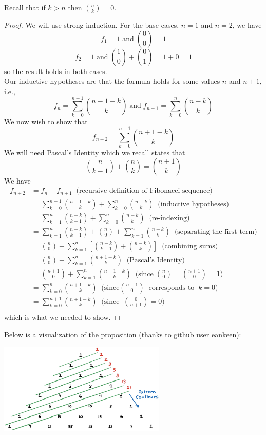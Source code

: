 \documentclass[handout]{ximera}
\begin{document}
\begin{remark}
Recall that if $k>n$ then $\binom{n}{k} = 0$.
\end{remark}

\begin{proof}
We will use strong induction. For the base cases, $n=1$ and $n=2$, we have
\[
f_1 =1  \; \text{and} \; \binom{0}{0} = 1 
\]
\[
f_2 =  1 \; \text{and} \; 
\binom{1}{0} + \binom{0}{1} = 1 + 0 = 1
\]
so the result holds in both cases.\\
Our inductive hypotheses are that the formula holds for some values $n$ and $n+1$, i.e., 
\[
f_n = \sum_{k=0}^{n-1} \binom{n-1-k}{k}  \;\text{and}\; f_{n+1} = \sum_{k=0}^{n} \binom{n-k}{k}
\]
We now wish to show that
\[
f_{n+2} = \sum_{k=0}^{n+1} \binom{n+1-k}{k}
\]
We will need Pascal's Identity  which we recall states that
\[
 \binom{n}{k-1}+ \binom{n}{k}=\binom{n+1}{k}
\]
We have
\begin{align*}
f_{n+2} &= f_n + f_{n+1}\;\; \text{(recursive definition of Fibonacci sequence)}\\
        &= \sum_{k=0}^{n-1} \binom{n-1-k}{k}  + \sum_{k=0}^{n} \binom{n-k}{k} \;\;\text{(inductive hypotheses)}\\
        &= \sum_{k=1}^{n} \binom{n-k}{k-1}  + \sum_{k=0}^{n} \binom{n-k}{k} \;\;\text{(re-indexing)}\\
        &= \sum_{k=1}^{n} \binom{n-k}{k-1}  + \binom{n}{0} + \sum_{k=1}^{n} \binom{n-k}{k} \;\;\text{(separating the first term)}\\
        &= \binom{n}{0} + \sum_{k=1}^{n} \left[\binom{n-k}{k-1} + \binom{n-k}{k} \right] \;\;\text{(combining sums)}\\
        &= \binom{n}{0} + \sum_{k=1}^{n} \binom{n+1-k}{k} \;\;\text{(Pascal's Identity)}\\
        &= \binom{n+1}{0} + \sum_{k=1}^{n} \binom{n+1-k}{k} \;\;\text{(since} \;\binom{n}{0} = \binom{n+1}{0} = 1)\\
         &= \sum_{k=0}^{n} \binom{n+1-k}{k}\;\;\text{(since} \binom{n+1}{0} \;\; \text{corresponds to} \;\; k = 0) \\
         &= \sum_{k=0}^{n+1} \binom{n+1-k}{k} \;\;\text{(since} \;\; \binom{0}{n+1} = 0)\\
\end{align*} 
which is what we needed to show.
\end{proof}
Below is a visualization of the proposition (thanks to github user eankeen):
\begin{image}
\includegraphics[width=0.6\textwidth]{pascalfibonacci.jpg}
\end{image}
\end{document}

